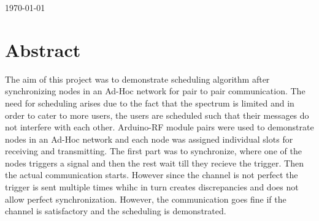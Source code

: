 \documentclass[12pt]{article}
\begin{document}
\begin{titlepage}


{\large \today}\\[2cm] %


 

\vfill %

 \newpage
 
 \tableofcontents
 
 \newpage

\end{titlepage}

 

 
 \newpage
 
 \section{Abstract}
 
The aim of this project was to demonstrate scheduling algorithm after synchronizing nodes in an Ad-Hoc network for pair to pair communication. The need for scheduling arises due to the fact that the spectrum is limited and in order to cater to more users, the users are scheduled such that their messages do not interfere with each other. Arduino-RF module pairs were used to demonstrate nodes in an Ad-Hoc network and each node was assigned individual slots for receiving and transmitting. The first part was to synchronize, where one of the nodes triggers a signal and then the rest wait till they recieve the trigger. Then the actual communication starts. However since the channel is not perfect the trigger is sent multiple times whihc in turn creates discrepancies and does not allow perfect synchronization. However, the communication goes fine if the channel is satisfactory and the scheduling is demonstrated. 
 
\end{document}

